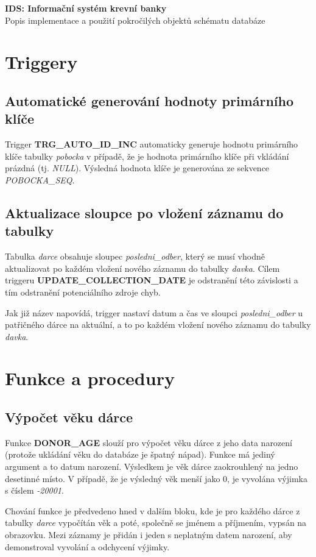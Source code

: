 \documentclass[10pt,a4paper]{article}
\begin{document}
\begin{center}
    \Large{\textbf{IDS: Informační systém krevní banky}} \\
    Popis implementace a použití pokročilých objektů schématu databáze
\end{center}

\section{Triggery}
\subsection{Automatické generování hodnoty primárního klíče}
    Trigger \textbf{TRG\_AUTO\_ID\_INC} automaticky generuje hodnotu primárního
    klíče tabulky \textit{pobocka} v případě, že je hodnota primárního klíče
    při vkládání prázdná (tj. \textit{NULL}). Výsledná hodnota klíče je
    generována ze sekvence \textit{POBOCKA\_SEQ}.
\subsection{Aktualizace sloupce po vložení záznamu do tabulky}
    Tabulka \textit{darce} obsahuje sloupec \textit{posledni\_odber},
    který se musí vhodně aktualizovat po každém vložení nového záznamu
    do tabulky \textit{davka}. Cílem triggeru \textbf{UPDATE\_COLLECTION\_DATE}
    je odstranění této závislosti a tím odstranění potenciálního zdroje chyb.

    Jak již název napovídá, trigger nastaví datum a čas ve sloupci
    \textit{posledni\_odber} u patřičného dárce na aktuální, a to po každém
    vložení nového záznamu do tabulky \textit{davka}.
\section{Funkce a procedury}
\subsection{Výpočet věku dárce}
    Funkce \textbf{DONOR\_AGE} slouží pro výpočet věku dárce z jeho data
    narození (protože ukládání věku do databáze je špatný nápad). Funkce
    má jediný argument a to datum narození. Výsledkem je věk dárce zaokrouhlený
    na jedno desetinné místo. V případě, že je výsledný věk menší jako 0,
    je vyvolána výjimka s číslem \textit{-20001}.

    Chování funkce je předvedeno hned v dalším bloku, kde je pro každého dárce
    z tabulky \textit{darce} vypočítán věk a poté, společně se jménem a
    příjmením, vypsán na obrazovku. Mezi záznamy je přidán i jeden s neplatným
    datem narození, aby demonstroval vyvolání a odchycení výjimky.
\end{document}
